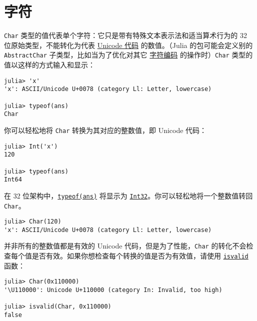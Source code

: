 \hypertarget{11743000381881707413}{}


\section{字符}



\texttt{Char} 类型的值代表单个字符：它只是带有特殊文本表示法和适当算术行为的 32 位原始类型，不能转化为代表 \href{https://en.wikipedia.org/wiki/Code\_point}{Unicode 代码} 的数值。（Julia 的包可能会定义别的 \texttt{AbstractChar} 子类型，比如当为了优化对其它 \href{https://en.wikipedia.org/wiki/Character\_encoding}{字符编码} 的操作时）\texttt{Char} 类型的值以这样的方式输入和显示：




\begin{verbatim}
julia> 'x'
'x': ASCII/Unicode U+0078 (category Ll: Letter, lowercase)

julia> typeof(ans)
Char
\end{verbatim}



你可以轻松地将 \texttt{Char} 转换为其对应的整数值，即 Unicode 代码：




\begin{verbatim}
julia> Int('x')
120

julia> typeof(ans)
Int64
\end{verbatim}



在 32 位架构中，\hyperlink{13440452181855594120}{\texttt{typeof(ans)}} 将显示为 \hyperlink{10103694114785108551}{\texttt{Int32}}。你可以轻松地将一个整数值转回 \texttt{Char}。




\begin{verbatim}
julia> Char(120)
'x': ASCII/Unicode U+0078 (category Ll: Letter, lowercase)
\end{verbatim}



并非所有的整数值都是有效的 Unicode 代码，但是为了性能，\texttt{Char} 的转化不会检查每个值是否有效。如果你想检查每个转换的值是否为有效值，请使用 \hyperlink{9678448882095016755}{\texttt{isvalid}} 函数：




\begin{verbatim}
julia> Char(0x110000)
'\U110000': Unicode U+110000 (category In: Invalid, too high)

julia> isvalid(Char, 0x110000)
false
\end{verbatim}



